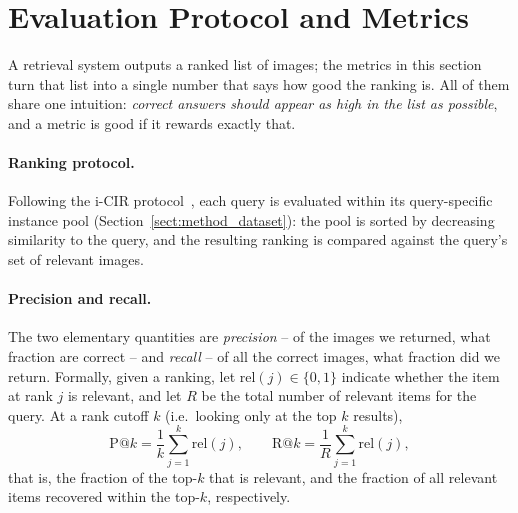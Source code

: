 \section{Evaluation Protocol and Metrics}\label{sect:method_eval}

A retrieval system outputs a ranked list of images; the metrics in this section
turn that list into a single number that says how good the ranking is. All of
them share one intuition: \emph{correct answers should appear as high in the list
as possible}, and a metric is good if it rewards exactly that.

\paragraph{Ranking protocol.}
Following the i-CIR protocol~\cite{psomas2025icir}, each query is evaluated within
its query-specific instance pool (Section~\ref{sect:method_dataset}): the pool is
sorted by decreasing similarity to the query, and the resulting ranking is
compared against the query's set of relevant images.

\paragraph{Precision and recall.}
The two elementary quantities are \emph{precision} -- of the images we returned,
what fraction are correct -- and \emph{recall} -- of all the correct images, what
fraction did we return. Formally, given a ranking, let $\mathrm{rel}(j)\in\{0,1\}$
indicate whether the item at rank $j$ is relevant, and let $R$ be the total number
of relevant items for the query. At a rank cutoff $k$ (i.e.\ looking only at the
top $k$ results),
\begin{equation}\label{eq:prec_rec}
    \mathrm{P}@k = \frac{1}{k}\sum_{j=1}^{k}\mathrm{rel}(j),
    \qquad
    \mathrm{R}@k = \frac{1}{R}\sum_{j=1}^{k}\mathrm{rel}(j),
\end{equation}
that is, the fraction of the top-$k$ that is relevant, and the fraction of all
relevant items recovered within the top-$k$, respectively.


